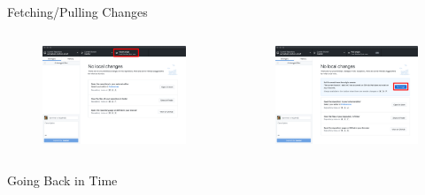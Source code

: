 \documentclass{beamer}
\begin{document}
    \begin{frame}{Fetching/Pulling Changes}
        \begin{columns}
            \begin{figure}
                \centering
                \includegraphics[width=\textwidth]{figures/pull_1.png}
            \end{figure}

            \begin{figure}
                \centering
                \includegraphics[width=\textwidth]{figures/pull_2.png}
            \end{figure}
        \end{columns}
    \end{frame}

    \begin{frame}{Going Back in Time}
    \end{frame}
\end{document}
